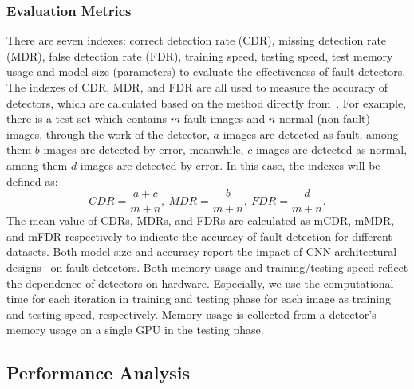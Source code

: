 \subsubsection{Evaluation Metrics} There are seven indexes: correct detection rate (CDR), missing detection rate (MDR), false detection rate (FDR), training speed, testing speed, test memory usage and model size (parameters) to evaluate the effectiveness of fault detectors. The indexes of CDR, MDR, and FDR are all used to measure the accuracy of detectors, which are calculated based on the method directly from~\cite{8911418}. For example, there is a test set which contains $m$ fault images and $n$ normal (non-fault) images, through the work of the detector, $a$ images are detected as fault, among them $b$ images are detected by error, meanwhile, $c$ images are detected as normal, among them $d$ images are detected by error. In this case, the indexes will be defined as:
\begin{equation}
  CDR = \frac{a+c}{m+n},\ MDR = \frac{b}{m+n},\ FDR = \frac{d}{m+n}.
\end{equation}
The mean value of CDRs, MDRs, and FDRs are calculated as mCDR, mMDR, and mFDR respectively to indicate the accuracy of fault detection for different datasets. Both model size and accuracy report the impact of CNN architectural designs~\cite{iandola2016squeezenet} on fault detectors. Both memory usage and training/testing speed reflect the dependence of detectors on hardware. Especially, we use the computational time for each iteration in training and testing phase for each image as training and testing speed, respectively. Memory usage is collected from a detector's memory usage on a single GPU in the testing phase.

\subsection{Performance Analysis}
\label{analysisframework}

